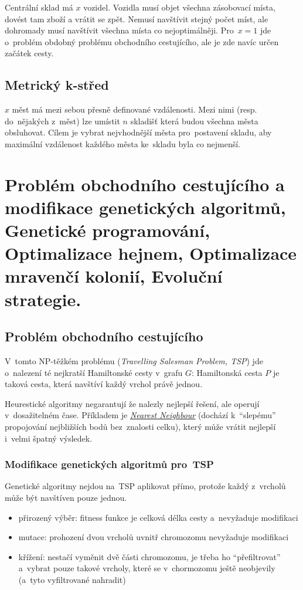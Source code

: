 Centrální sklad má $x$ vozidel.
Vozidla musí objet všechna zásobovací místa, dovést tam zboží a vrátit se zpět.
Nemusí navštívit stejný počet míst, ale dohromady musí navštívit všechna místa co nejoptimálněji.
Pro~$x=1$ jde o~problém obdobný problému obchodního cestujícího, ale je zde navíc určen začátek cesty.

\subsection{Metrický k-střed}

$x$ měst má mezi sebou přesně definované vzdálenosti.
Mezi nimi (resp. do~nějakých z~měst) lze umístit $n$ skladišť která budou všechna města obsluhovat.
Cílem je vybrat nejvhodnější města pro~postavení skladu, aby maximální vzdálenost každého města ke~skladu byla co nejmenší.

\clearpage
\section{Problém obchodního cestujícího a modifikace genetických algoritmů, Genetické programování, Optimalizace hejnem, Optimalizace mravenčí kolonií, Evoluční strategie.}

\subsection{Problém obchodního cestujícího}

V~tomto NP-těžkém problému (\emph{Travelling Salesman Problem, TSP}) jde o~nalezení té nejkratší Hamiltonské cesty v~grafu $G$:
Hamiltonská cesta $P$ je taková cesta, která navštíví každý vrchol právě jednou.

Heurestické algoritmy negarantují že nalezly nejlepší řešení, ale operují v~dosažitelném čase.
Příkladem je \href{https://en.wikipedia.org/wiki/Nearest_neighbour_algorithm}{\emph{Nearest Neighbour}} (dochází k~\enquote{slepému} propojování nejbližších bodů bez~znalosti celku), který může vrátit nejlepší i~velmi špatný výsledek.

\subsubsection{Modifikace genetických algoritmů pro~TSP}

Genetické algoritmy nejdou na~TSP aplikovat přímo, protože každý z~vrcholů může být navštíven pouze jednou.

\begin{itemize}
\item přirozený výběr: fitness funkce je celková délka cesty a~nevyžaduje modifikaci
\item mutace: prohození dvou vrcholů uvnitř chromozomu nevyžaduje modifikaci
\item křížení: nestačí vyměnit dvě části chromozomu, je třeba ho \enquote{přefiltrovat} a~vybrat pouze takové vrcholy, které se v~chormozomu ještě neobjevily (a~tyto vyfiltrované nahradit)
\end{itemize}

